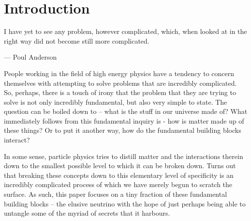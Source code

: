 \section{Introduction}

I have yet to see any problem, however complicated, which, when looked at in the right way did not become still more complicated.

\begin{flushright}--- Poul Anderson\end{flushright}

People working in the field of high energy physics have a tendency to concern themselves with attempting to solve problems that are incredibly complicated.
So, perhaps, there is a touch of irony that the problem that they are trying to solve is not only incredibly fundamental, but also very simple to state.
The question can be boiled down to -- what is the stuff in our universe made of?
What immediately follows from this fundamental inquiry is - how is matter made up of these things? Or to put it another way, how do the fundamental building blocks interact?

In some sense, particle physics tries to distill matter and the interactions therein down to the smallest possible level to which it can be broken down.
Turns out that breaking these concepts down to this elementary level of specificity is an incredibly complicated process of which we have merely begun to scratch the surface.  As such, this paper focuses on a tiny fraction of these fundamental building blocks -- the elusive neutrino with the hope of just perhaps being able to untangle some of the myriad of secrets that it harbours.





























